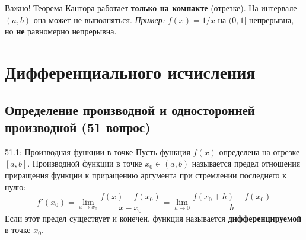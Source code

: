 \documentclass[a4paper,12pt]{article}
\begin{document}
	
	\vspace{0.5cm}
	\begin{importantbox}{Важно!}
		Теорема Кантора работает \textbf{только на компакте} (отрезке). На интервале $(a, b)$ она может не выполняться. 
		\textit{Пример:} $f(x) = 1/x$ на $(0, 1]$ непрерывна, но \textbf{не} равномерно непрерывна.
	\end{importantbox}
	
	
	
	
	
	
	
		
	\newpage
	\section{Дифференциального исчисления}	
	\subsection{Определение производной и односторонней производной (51 вопрос)}

	
	\begin{definitionbox}{51.1: Производная функции в точке}
		Пусть функция $f(x)$ определена на отрезке $[a, b]$. Производной функции в точке $x_0 \in (a, b)$ называется предел отношения приращения функции к приращению аргумента при стремлении последнего к нулю:
		$$ f'(x_0) = \lim_{x \to x_0} \frac{f(x) - f(x_0)}{x - x_0} = \lim_{h \to 0} \frac{f(x_0 + h) - f(x_0)}{h} $$
		Если этот предел существует и конечен, функция называется \textbf{дифференцируемой} в точке $x_0$.
	\end{definitionbox}
	
\end{document}
